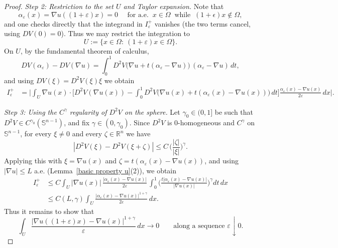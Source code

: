 \documentclass[10pt,a4paper]{amsart}
\def\ez{\epsilon}
\begin{document}
\begin{proof}
\medskip
\noindent\textit{Step 2: Restriction to the set $U$ and Taylor expansion.}
Note that
$$\alpha_\varepsilon(x)=\nabla u((1+\varepsilon)x)=0  \quad \text{ for a.e.  } \ x\in \Omega \ \text{ while } \ (1+\ez)x\notin \Omega,$$ 
and one checks directly that
the integrand in $I_\varepsilon^+$ vanishes (the two terms cancel, using $DV(0)=0$).
Thus we may restrict the integration to
\[
U:=\{x\in\Omega:\ (1+\varepsilon)x\in\Omega\}.
\]
On $U$, by the fundamental theorem of calculus,
\[
DV(\alpha_\varepsilon)-DV(\nabla u)
=\int_0^1 D^2V\bigl(\nabla u+t(\alpha_\varepsilon-\nabla u)\bigr)\,(\alpha_\varepsilon-\nabla u)\,dt,
\]
and using $DV(\xi)=D^2V(\xi)\xi$ we obtain
\begin{align*}
I_\varepsilon^+
&=\Bigg|\int_{U}\nabla u(x)\cdot \Bigg[
D^2V(\nabla u(x))
-\int_0^1 D^2V\bigl(\nabla u(x)+t(\alpha_\varepsilon(x)-\nabla u(x))\bigr)\,dt
\Bigg]\frac{\alpha_\varepsilon(x)-\nabla u(x)}{2\varepsilon}\,dx\Bigg|.
\end{align*}

\medskip
\noindent\textit{Step 3: Using the $C^\gamma$ regularity of $D^2V$ on the sphere.}
Let $\gamma_0 \in (0,1]$ be such that $D^2V\in C^{\gamma_0}(\mathbb S^{n-1})$, and fix $\gamma \in (0,\gamma_0)$.
Since $D^2V$ is $0$-homogeneous and $C^\gamma$ on $\mathbb S^{n-1}$, for every $\xi\neq 0$ and every $\zeta\in\mathbb R^n$ we have
\[
|D^2V(\xi)-D^2V(\xi+\zeta)|
\le C\,\bigg(\frac{|\zeta|}{|\xi|}\bigg)^\gamma.
\]
Applying this with $\xi=\nabla u(x)$ and $\zeta=t(\alpha_\varepsilon(x)-\nabla u(x))$, and using $|\nabla u|\le L$ a.e.
(Lemma~\ref{basic property u}(2)), we obtain
\begin{align*}
I_\varepsilon^+
&\le C\int_U |\nabla u(x)|\,\frac{|\alpha_\varepsilon(x)-\nabla u(x)|}{2\varepsilon}\,
\int_0^1 \bigg(\frac{t|\alpha_\varepsilon(x)-\nabla u(x)|}{|\nabla u(x)|}\bigg)^\gamma dt\,dx\\
&\le C(L,\gamma)\int_U \frac{|\alpha_\varepsilon(x)-\nabla u(x)|^{1+\gamma}}{2\varepsilon}\,dx.
\end{align*}
Thus it remains to show that
\begin{equation}\label{eq:goal-alpha}
\int_U \frac{|\nabla u((1+\varepsilon)x)-\nabla u(x)|^{1+\gamma}}{\varepsilon}\,dx\to 0
\qquad\text{along a sequence }\varepsilon\downarrow 0.
\end{equation}


\end{proof}
\end{document}

